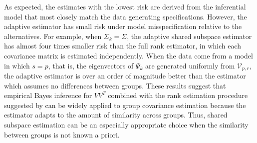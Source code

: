 \documentclass[12pt]{article}
\begin{document}
As expected, the estimates with the lowest risk are derived from the
inferential model that most closely match the data generating
specifications. However, the adaptive estimator has small risk under
model misspecification relative to the alternatives.  For example,
when $\Sigma_k = \Sigma$, the adaptive shared subspace estimator has
almost four times smaller risk than the full rank estimator, in which
each covariance matrix is estimated independently.  When the
data come from a model in which $s=p$, that is, the eigenvectors of $\Psi_k$
are generated uniformly from $\mathcal{V}_{p,r}$, the adaptive
estimator is over an order of magnitude better than the estimator
which assumes no differences between groups.  These results suggest
that empirical Bayes inference for $VV^T$ combined with the rank
estimation procedure suggested by \citet{Gavish2014} can be widely
applied to group covariance estimation because the estimator adapts to
the amount of similarity across groups.  Thus, shared subspace estimation
can be an especially appropriate choice when the similarity between
groups is not known a priori.  %


\end{document}
